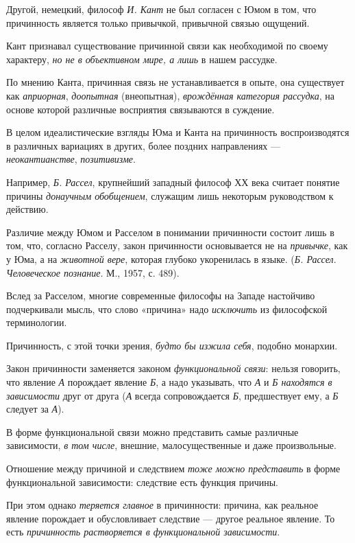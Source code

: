 \documentclass[a4paper,14pt,russian]{extreport}
\begin{document}
Другой, немецкий, философ \emph{И. Кант} не был согласен с Юмом в том, что причинность является только привычкой, привычной связью ощущений.

Кант признавал существование причинной связи как необходимой по своему характеру, \emph{но не в объективном мире, а лишь} в нашем рассудке.

По мнению Канта, причинная связь не устанавливается в опыте, она существует как \emph{априорная}, \emph{доопытная} (внеопытная), \emph{врождённая категория рассудка}, на основе которой различные восприятия связываются в суждение.

В целом идеалистические взгляды Юма и Канта на причинность воспроизводятся в различных вариациях в других, более поздних направлениях --- \emph{неокантианстве}, \emph{позитивизме}.

Например, \emph{Б. Рассел}, крупнейший западный философ ХХ века считает понятие причины \emph{донаучным обобщением}, служащим лишь некоторым руководством к действию.

Различие между Юмом и Расселом в понимании причинности состоит лишь в том, что, согласно Расселу, закон причинности основывается не на \emph{привычке}, как у Юма, а на \emph{животной вере}, которая глубоко укоренилась в языке. (\emph{Б. Рассел}. \emph{Человеческое познание}. М., 1957, с. 489).

Вслед за Расселом, многие современные философы на Западе настойчиво подчеркивали мысль, что слово «причина» надо \emph{исключить} из философской терминологии.

Причинность, с этой точки зрения, \emph{будто бы изжила себя}, подобно монархии.

Закон причинности заменяется законом \emph{функциональной связи}: нельзя говорить, что явление \emph{А} порождает явление \emph{Б}, а надо указывать, что \emph{А} и \emph{Б находятся в зависимости} друг от друга (\emph{А} всегда сопровождается \emph{Б}, предшествует ему, а \emph{Б} следует за \emph{А}).

В форме функциональной связи можно представить самые различные зависимости, \emph{в том числе}, внешние, малосущественные и даже произвольные.

Отношение между причиной и следствием \emph{тоже можно представить} в форме функциональной зависимости: следствие есть функция причины.

При этом однако \emph{теряется главное} в причинности: причина, как реальное явление порождает и обусловливает следствие --- другое реальное явление. То есть \emph{причинность растворяется в функциональной зависимости}.
\end{document}
